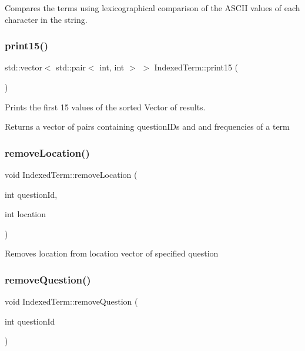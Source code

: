 Compares the terms using lexicographical comparison of the A\+S\+C\+II values of each character in the string. \mbox{\label{classIndexedTerm_acbffdf0e7324840c5157ff18f3de67cc}} 
\subsubsection{\texorpdfstring{print15()}{print15()}}
{\footnotesize\ttfamily std\+::vector$<$ std\+::pair$<$ int, int $>$ $>$ Indexed\+Term\+::print15 (\begin{DoxyParamCaption}{ }\end{DoxyParamCaption})}



Prints the first 15 values of the sorted Vector of results. 

\begin{DoxyReturn}{Returns}
a vector of pairs containing question\+I\+Ds and and frequencies of a term 
\end{DoxyReturn}
\mbox{\label{classIndexedTerm_ac0b5314a66c032780ffcd9d4f9a1d01b}} 
\subsubsection{\texorpdfstring{remove\+Location()}{removeLocation()}}
{\footnotesize\ttfamily void Indexed\+Term\+::remove\+Location (\begin{DoxyParamCaption}\item[{int}]{question\+Id,  }\item[{int}]{location }\end{DoxyParamCaption})}

Removes location from location vector of specified question \mbox{\label{classIndexedTerm_a766b250a2e276ddd3270e1eb19d1d10d}} 
\subsubsection{\texorpdfstring{remove\+Question()}{removeQuestion()}}
{\footnotesize\ttfamily void Indexed\+Term\+::remove\+Question (\begin{DoxyParamCaption}\item[{int}]{question\+Id }\end{DoxyParamCaption})}

